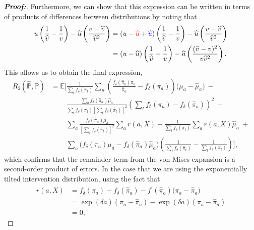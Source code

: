 \documentclass[11pt,twoside]{article}
\theoremstyle{definition}
\theoremstyle{remark}
\begin{document}
\begin{proof}[\textbf{Proof:}]
Furthermore, we can show that this expression can be written in terms of products of differences between distributions by noting that
\begin{align*}
    u\left( \frac{1}{\widehat{v}} - \frac{1}{v}\right) - \widehat{u}\left( \frac{v - \widehat{v}}{\widehat{v}^2}\right) &= (u - \textcolor{red}{\widehat{u}} + \textcolor{blue}{\widehat{u}}) \left( \frac{1}{\widehat{v}} - \frac{1}{v}\right) - \widehat{u}\left( \frac{v - \widehat{v}}{\widehat{v}^2}\right) \\
    &= (u - \widehat{u})\left( \frac{1}{\widehat{v}} - \frac{1}{v}\right) - \widehat{u}\left(\frac{(\widehat{v} - v)^2}{v \widehat{v}^2} \right).
\end{align*}
This allows us to obtain the final expression,
\begin{align*}
     R_2(\widehat{\mathbb{P}}, \mathbb{P}) &= \mathbb{E} \Bigg[ \frac{1}{\sum_t f_\delta(\widehat{\pi}_t)} \sum_a \left(\frac{f_\delta(\widehat{\pi}_a) \pi_a}{\widehat{\pi}_a} - f_\delta(\pi_a) \right)\big(\mu_a - \widehat{\mu}_a \big) \: - \\
    &\phantom{{}={\mathbb{E} \Bigg[}} \frac{\sum_a f_\delta( \widehat{\pi}_a) \widehat{\mu}_a}{\sum_t f_\delta(\pi_t)\left[\sum_t f_\delta(\widehat{\pi}_t) \right]^2} \left( \sum_t  f_\delta(\pi_a) - f_\delta(\widehat{\pi}_a)   \right)^2 \: + \\
    &\phantom{{}={\mathbb{E} \Bigg[}} \sum_a \frac{f_\delta( \widehat{\pi}_a) \widehat{\mu}_a}{\left[\sum_t f_\delta(\widehat{\pi}_t) \right]^2}  \sum_a r(a, X)  -  \frac{1}{\sum_t f_\delta(\widehat{\pi}_t) }\sum_a  r(a, X) \widehat{\mu}_a  \: + \\
    &\phantom{{}={\mathbb{E} \Bigg[}} \sum_a \Big( f_\delta(\pi_a ) \mu_a - f_\delta(\widehat{\pi}_a) \widehat{\mu}_a \Big) \left(\frac{1}{\sum_t f_\delta(\widehat{\pi}_t)} - \frac{1}{\sum_t f_\delta(\pi_t )} \right) \Bigg],
\end{align*}
which confirms that the remainder term from the von Mises expansion is a second-order product of errors. In the case that we are using the exponentially tilted intervention distribution, using the fact that
\begin{align*}
    r(a, X) &= f_\delta(\pi_a) - f_\delta(\widehat{\pi}_a) - f^\prime (\widehat{\pi}_a) \big(\pi_a - \widehat{\pi}_a \big) \\
    &= \exp(\delta a)( \pi_a -  \widehat{\pi}_a) - \exp(\delta a) (\pi_a - \widehat{\pi}_a) \\
    &= 0,
\end{align*}

\end{proof}
\end{document}
